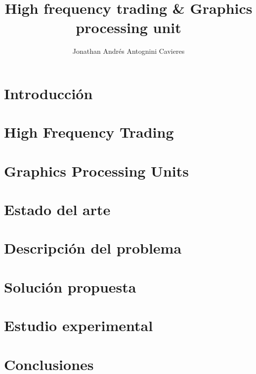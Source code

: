 \documentclass[12pt,letterpaper]{report}
\begin{document}

\title{High frequency trading \& Graphics processing unit}
\author{Jonathan Andrés Antognini Cavieres}
\ingciv



\tableofcontents
\listoffigures
\listoftables

\chapter{Introducción}
	

\chapter{High Frequency Trading}
	

\chapter{Graphics Processing Units}
	

\chapter{Estado del arte}
	

\chapter{Descripción del problema}
	

\chapter{Solución propuesta}
	

\chapter{Estudio experimental}
	

\chapter{Conclusiones}
	

\singlespacing

%
\nocite{*} %

\end{document}
